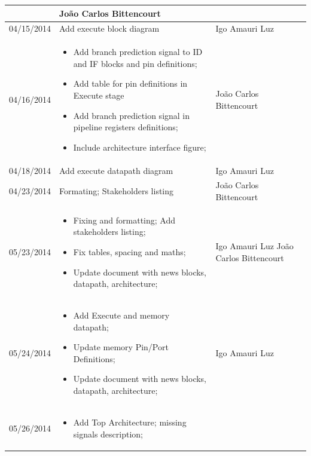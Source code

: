 \documentclass{article}
\begin{document}
\begin{center}
\begin{longtable}[pos]{|m{2cm} | m{7.2cm} | m{3.8cm}|}
\begin{small}
      \end{small} & \small João Carlos Bittencourt \\ \hline
      \small 04/15/2014 & \small Add execute block diagram & \small Igo Amauri Luz \\ \hline
      \small 04/16/2014 & \small   \begin{small}
        \begin{itemize}
          \item Add branch prediction signal to ID and IF blocks and pin definitions;
          \item Add table for pin definitions in Execute stage
          \item Add branch prediction signal in pipeline registers definitions;
          \item Include architecture interface figure;
        \end{itemize}
      \end{small} & \small João Carlos Bittencourt \\ \hline 
      \small 04/18/2014 & \small Add execute datapath diagram & \small Igo Amauri Luz \\ \hline
      \small 04/23/2014 & \small Formating; Stakeholders listing & \small João Carlos Bittencourt \\ \hline  
      \small 05/23/2014 & \small 
        \begin{itemize}
          \item Fixing and formatting; Add stakeholders listing;
          \item Fix tables, spacing and maths;
          \item Update document with news blocks, datapath, architecture;
        \end{itemize} & \small Igo Amauri Luz \newline João Carlos Bittencourt \\ \hline  
      \small 05/24/2014 & \small     \begin{itemize}
          \item Add Execute and memory datapath; 
          \item Update memory Pin/Port Definitions;
          \item Update document with news blocks, datapath, architecture;
        \end{itemize} & \small Igo Amauri Luz \\ \hline  
      \small 05/26/2014 & \small     \begin{itemize}
          \item Add Top Architecture; missing signals description;

\end{itemize}
\end{longtable}
\end{center}
\end{document}
